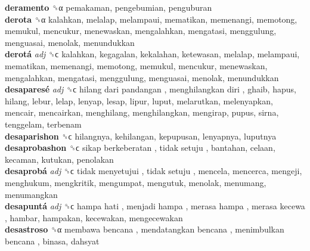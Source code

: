 \textbf{deramento} ␝α  pemakaman, pengebumian, penguburan  \\
\textbf{derota} ␝α  kalahkan, melalap, melampaui, mematikan, memenangi, memotong, memukul, mencukur, menewaskan, mengalahkan, mengatasi, menggulung, menguasai, menolak, menundukkan  \\
\textbf{derotá} \emph{adj}  ␝ϲ  kalahkan, kegagalan, kekalahan, ketewasan, melalap, melampaui, mematikan, memenangi, memotong, memukul, mencukur, menewaskan, mengalahkan, mengatasi, menggulung, menguasai, menolak, menundukkan  \\
\textbf{desaparesé} \emph{adj}  ␝ϲ   hilang dari pandangan ,  menghilangkan diri , ghaib, hapus, hilang, lebur, lelap, lenyap, lesap, lipur, luput, melarutkan, melenyapkan, mencair, mencairkan, menghilang, menghilangkan, mengirap, pupus, sirna, tenggelam, terbenam  \\
\textbf{desaparishon} ␝ϲ  hilangnya, kehilangan, kepupusan, lenyapnya, luputnya  \\
\textbf{desaprobashon} ␝ϲ   sikap berkeberatan ,  tidak setuju , bantahan, celaan, kecaman, kutukan, penolakan  \\
\textbf{desaprobá} \emph{adj}  ␝ϲ   tidak menyetujui ,  tidak setuju , mencela, mencerca, mengeji, menghukum, mengkritik, mengumpat, mengutuk, menolak, menumang, menumangkan  \\
\textbf{desapuntá} \emph{adj}  ␝ϲ   hampa hati ,  menjadi hampa ,  merasa hampa ,  merasa kecewa , hambar, hampakan, kecewakan, mengecewakan  \\
\textbf{desastroso} ␝α   membawa bencana ,  mendatangkan bencana ,  menimbulkan bencana , binasa, dahsyat  \\
